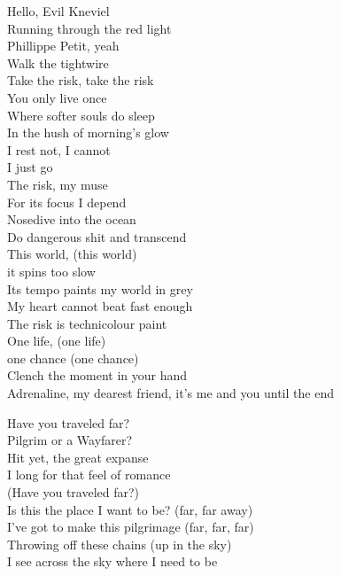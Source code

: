 
Hello, Evil Kneviel \\
Running through the red light \\
Phillippe Petit, yeah \\
Walk the tightwire \\
Take the risk, take the risk \\
You only live once \\

Where softer souls do sleep \\
In the hush of morning's glow \\
I rest not, I cannot \\
I just go \\
The risk, my muse \\
For its focus I depend \\
Nosedive into the ocean \\
Do dangerous shit and transcend \\
This world, (this world) \\
it spins too slow \\
Its tempo paints my world in grey \\
My heart cannot beat fast enough \\
The risk is technicolour paint \\
One life, (one life) \\
one chance (one chance) \\
Clench the moment in your hand \\
Adrenaline, my dearest friend, it's me and you until the end \\



Have you traveled far? \\
Pilgrim or a Wayfarer? \\
Hit yet, the great expanse \\
I long for that feel of romance \\

(Have you traveled far?) \\
Is this the place I want to be? (far, far away) \\
I've got to make this pilgrimage (far, far, far) \\
Throwing off these chains (up in the sky) \\
I see across the sky where I need to be \\

